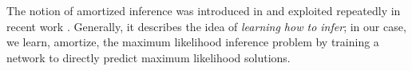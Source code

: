 



%
The notion of amortized inference was introduced in \cite{Gersham2014COGSCI} and exploited repeatedly in recent work \cite{RezendeICML2015,WangARXIV2016,RitchieARXIV2016}. Generally, it describes the idea of \emph{learning how to infer}; in our case, we learn, \ie amortize, the maximum likelihood inference problem by training a network to directly predict maximum likelihood solutions.